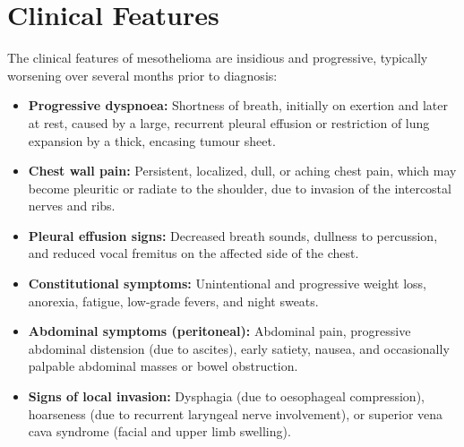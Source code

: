\section*{Clinical Features}
The clinical features of mesothelioma are insidious and progressive, typically worsening over several months prior to diagnosis:
\begin{itemize}
    \item \textbf{Progressive dyspnoea:} Shortness of breath, initially on exertion and later at rest, caused by a large, recurrent pleural effusion or restriction of lung expansion by a thick, encasing tumour sheet.
    \item \textbf{Chest wall pain:} Persistent, localized, dull, or aching chest pain, which may become pleuritic or radiate to the shoulder, due to invasion of the intercostal nerves and ribs.
    \item \textbf{Pleural effusion signs:} Decreased breath sounds, dullness to percussion, and reduced vocal fremitus on the affected side of the chest.
    \item \textbf{Constitutional symptoms:} Unintentional and progressive weight loss, anorexia, fatigue, low-grade fevers, and night sweats.
    \item \textbf{Abdominal symptoms (peritoneal):} Abdominal pain, progressive abdominal distension (due to ascites), early satiety, nausea, and occasionally palpable abdominal masses or bowel obstruction.
    \item \textbf{Signs of local invasion:} Dysphagia (due to oesophageal compression), hoarseness (due to recurrent laryngeal nerve involvement), or superior vena cava syndrome (facial and upper limb swelling).
\end{itemize}

